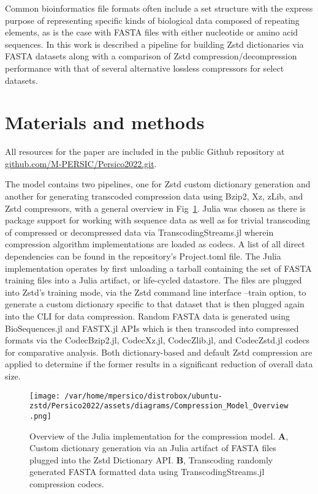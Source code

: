 \documentclass[
  10pt,
  letterpaper,
]{article}
\begin{document}
Common bioinformatics file formats often include a set structure with
the express purpose of representing specific kinds of biological data
composed of repeating elements, as is the case with FASTA files with
either nucleotide or amino acid sequences. In this work is described a
pipeline for building Zstd dictionaries via FASTA datasets along with a
comparison of Zstd compression/decompression performance with that of
several alternative lossless compressors for select datasets.

\hypertarget{materials-and-methods}{%
\section{Materials and methods}\label{materials-and-methods}}

All resources for the paper are included in the public Github repository
at
\href{https://www.github.com/M-PERSIC/Persico2022.git}{github.com/M-PERSIC/Persico2022.git}.

The model contains two pipelines, one for Zstd custom dictionary
generation and another for generating transcoded compression data using
Bzip2, Xz, zLib, and Zstd compressors, with a general overview in
Fig~\ref{fig-model}. Julia was chosen as there is package support for
working with sequence data as well as for trivial transcoding of
compressed or decompressed data via TranscodingStreams.jl wherein
compression algorithm implementations are loaded as codecs\citep{sato}.
A list of all direct dependencies can be found in the repository's
Project.toml file. The Julia implementation operates by first unloading
a tarball containing the set of FASTA training files into a Julia
artifact, or life-cycled datastore. The files are plugged into Zstd's
training mode, via the Zstd command line interface --train option, to
generate a custom dictionary specific to that dataset that is then
plugged again into the CLI for data compression. Random FASTA data is
generated using BioSequences.jl\citep{biosequences} and
FASTX.jl\citep{fastx} APIs which is then transcoded into compressed
formats via the CodecBzip2.jl\citep{codecbzip2},
CodecXz.jl\citep{codecxz}, CodecZlib.jl\citep{codeczlib}, and
CodecZstd.jl\citep{codeczstd} codecs for comparative analysis. Both
dictionary-based and default Zstd compression are applied to determine
if the former results in a significant reduction of overall data size.

\begin{figure}

{\centering \texttt{[image: /var/home/mpersico/distrobox/ubuntu-zstd/Persico2022/assets/diagrams/Compression\_Model\_Overview.png]}

}

\caption{\label{fig-model}Overview of the Julia implementation for the
compression model. \textbf{A}, Custom dictionary generation via an Julia
artifact of FASTA files plugged into the Zstd Dictionary API.
\textbf{B}, Transcoding randomly generated FASTA formatted data using
TranscodingStreams.jl\citep{sato} compression codecs.}

\end{figure}
\end{document}

